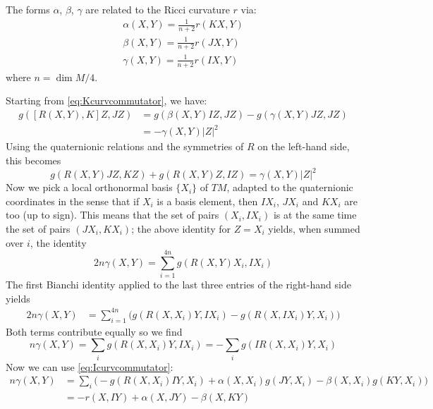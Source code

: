 \begin{myproof}
	\begin{lem}\label{lem:ricciforms}
		The forms $\alpha$, $\beta$, $\gamma$ are related to the Ricci curvature $r$ via:
		\begin{align*}
			\alpha(X,Y)=\frac{1}{n+2}r(KX,Y)\\ 
			\beta(X,Y)=\frac{1}{n+2}r(JX,Y)\\
			\gamma(X,Y)=\frac{1}{n+2}r(IX,Y)
		\end{align*}
		where $n=\dim M/4$.
	\end{lem}
	\begin{myproof}
		Starting from \eqref{eq:Kcurvcommutator}, we have:
		\begin{align*}
			g([R(X,Y),K]Z,JZ)&=
			g(\beta(X,Y)IZ,JZ)-g(\gamma(X,Y)JZ,JZ)\\
			&=-\gamma(X,Y)\lvert Z\rvert^2
		\end{align*}
		Using the quaternionic relations and the symmetries of $R$ on the left-hand side, this becomes
		\begin{equation}\label{eq:gammacurvrelation}
			g(R(X,Y)JZ,KZ)+g(R(X,Y)Z,IZ)=\gamma(X,Y)\lvert Z\rvert^2
		\end{equation}
		Now we pick a local orthonormal basis $\{X_i\}$ of $TM$, adapted to the quaternionic coordinates in the sense that if $X_i$ is a basis element, then $IX_i$, $JX_i$ and $K X_i$ are too (up to sign). This means that the set of pairs $(X_i,IX_i)$ is at the same time the set of pairs $(JX_i,KX_i)$; the above identity for $Z=X_i$ yields, when summed over $i$, the identity
		\begin{equation*}
			2n\gamma(X,Y)=\sum_{i=1}^{4n}g(R(X,Y)X_i,IX_i)
		\end{equation*}
		The first Bianchi identity applied to the last three entries of the right-hand side yields
		\begin{align*}
			2n\gamma(X,Y)
			&=\sum_{i=1}^{4n}\Big(g(R(X,X_i)Y,IX_i)-g(R(X,IX_i)Y,X_i)\Big)
		\end{align*}
		Both terms contribute equally so we find
		\begin{equation*}
			n\gamma(X,Y)=\sum_ig(R(X,X_i)Y,IX_i)=-\sum_i g(IR(X,X_i)Y,X_i)
		\end{equation*}
		Now we can use \eqref{eq:Icurvcommutator}:
		\begin{align*}
			n\gamma(X,Y)&=\sum_i\Big(-g(R(X,X_i)IY,X_i)+\alpha(X,X_i)g(JY,X_i)
			-\beta(X,X_i)g(KY,X_i)\Big)\\
			&=-r(X,IY)+\alpha(X,JY)-\beta(X,KY)
		\end{align*}

\end{myproof}
\end{myproof}
